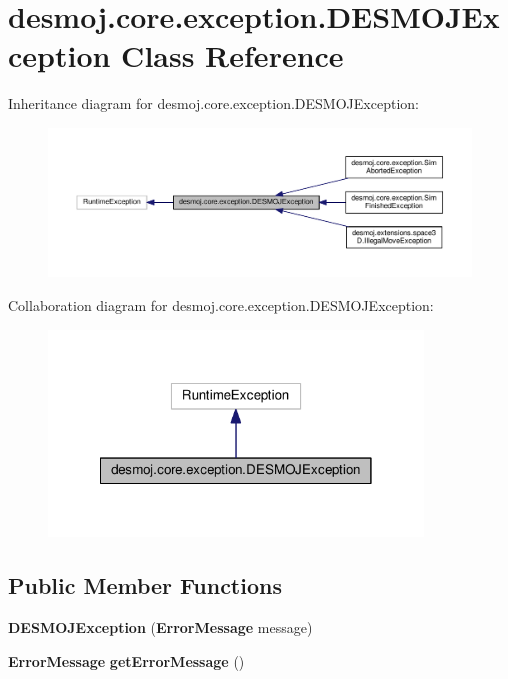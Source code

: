\section{desmoj.\-core.\-exception.\-D\-E\-S\-M\-O\-J\-Exception Class Reference}
\label{classdesmoj_1_1core_1_1exception_1_1_d_e_s_m_o_j_exception}


Inheritance diagram for desmoj.\-core.\-exception.\-D\-E\-S\-M\-O\-J\-Exception\-:
\nopagebreak
\begin{figure}[H]
\begin{center}
\leavevmode
\includegraphics[width=350pt]{classdesmoj_1_1core_1_1exception_1_1_d_e_s_m_o_j_exception__inherit__graph}
\end{center}
\end{figure}


Collaboration diagram for desmoj.\-core.\-exception.\-D\-E\-S\-M\-O\-J\-Exception\-:
\nopagebreak
\begin{figure}[H]
\begin{center}
\leavevmode
\includegraphics[width=282pt]{classdesmoj_1_1core_1_1exception_1_1_d_e_s_m_o_j_exception__coll__graph}
\end{center}
\end{figure}
\subsection*{Public Member Functions}
\begin{DoxyCompactItemize}
\item 
{\bf D\-E\-S\-M\-O\-J\-Exception} ({\bf Error\-Message} message)
\item 
{\bf Error\-Message} {\bf get\-Error\-Message} ()
\end{DoxyCompactItemize}


